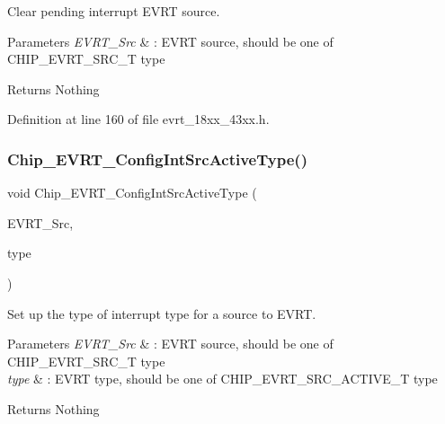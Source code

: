 Clear pending interrupt E\+V\+RT source. 


\begin{DoxyParams}{Parameters}
{\em E\+V\+R\+T\+\_\+\+Src} & \+: E\+V\+RT source, should be one of C\+H\+I\+P\+\_\+\+E\+V\+R\+T\+\_\+\+S\+R\+C\+\_\+T type \\
\hline
\end{DoxyParams}
\begin{DoxyReturn}{Returns}
Nothing 
\end{DoxyReturn}


Definition at line 160 of file evrt\+\_\+18xx\+\_\+43xx.\+h.

\mbox{\label{group___e_v_r_t__18_x_x__43_x_x_ga4a317e0d292116144f6a6951c0bf25fa}} 
\subsubsection{\texorpdfstring{Chip\+\_\+\+E\+V\+R\+T\+\_\+\+Config\+Int\+Src\+Active\+Type()}{Chip\_EVRT\_ConfigIntSrcActiveType()}}
{\footnotesize\ttfamily void Chip\+\_\+\+E\+V\+R\+T\+\_\+\+Config\+Int\+Src\+Active\+Type (\begin{DoxyParamCaption}\item[{\hyperlink{group___e_v_r_t__18_x_x__43_x_x_gaa43c01b5839b8ef001017d1d1150b16d}{C\+H\+I\+P\+\_\+\+E\+V\+R\+T\+\_\+\+S\+R\+C\+\_\+T}}]{E\+V\+R\+T\+\_\+\+Src,  }\item[{\hyperlink{group___e_v_r_t__18_x_x__43_x_x_ga41e06d681302344e72fc1eca77f708b4}{C\+H\+I\+P\+\_\+\+E\+V\+R\+T\+\_\+\+S\+R\+C\+\_\+\+A\+C\+T\+I\+V\+E\+\_\+T}}]{type }\end{DoxyParamCaption})}



Set up the type of interrupt type for a source to E\+V\+RT. 


\begin{DoxyParams}{Parameters}
{\em E\+V\+R\+T\+\_\+\+Src} & \+: E\+V\+RT source, should be one of C\+H\+I\+P\+\_\+\+E\+V\+R\+T\+\_\+\+S\+R\+C\+\_\+T type \\
\hline
{\em type} & \+: E\+V\+RT type, should be one of C\+H\+I\+P\+\_\+\+E\+V\+R\+T\+\_\+\+S\+R\+C\+\_\+\+A\+C\+T\+I\+V\+E\+\_\+T type \\
\hline
\end{DoxyParams}
\begin{DoxyReturn}{Returns}
Nothing 
\end{DoxyReturn}


